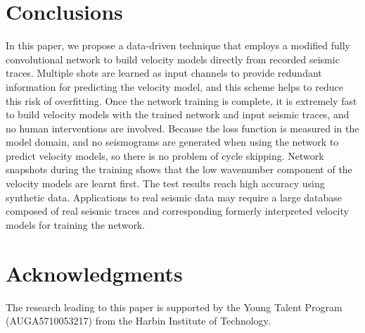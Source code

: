 \documentclass{segabs}
\begin{document}


\section{Conclusions}
In this paper, we propose a data-driven technique that employs a modified fully convolutional network to build velocity models directly from recorded seismic traces. 
Multiple shots are learned as input channels to provide redundant information for predicting the velocity model, and this scheme helps to reduce this risk of overfitting. 
Once the network training is complete, it is extremely fast to build velocity models with the trained network and input seismic traces, and no human interventions are involved. 
Because the loss function is measured in the model domain, and no seismograms are generated when using the network to predict velocity models, so there is no problem of cycle skipping. 
Network snapshots during the training shows that the low wavenumber component of the velocity models are learnt first. The test results reach high accuracy using synthetic data. Applications to real seismic data may require a large database composed of real seismic traces and corresponding formerly interpreted velocity models for training the network.


\section{Acknowledgments}

The research leading to this paper is supported by the Young Talent Program (AUGA5710053217) from the Harbin Institute of Technology. 

\newpage


\end{document}
